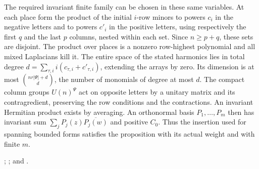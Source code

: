 The required invariant finite family can be chosen in these same
variables. At each place form the product of the initial $i$-row
minors to powers $c_i$ in the negative letters and to powers $c'_i$
in the positive letters, using respectively the first $q$ and the
last $p$ columns, nested within each set. Since $n\ge p+q$, these
sets are disjoint. The product over places is a nonzero row-highest
polynomial and all mixed Laplacians kill it. The entire space of
the stated harmonics lies in total degree
$d=\sum_{\tau,i}i(c_{\tau,i}+c'_{\tau,i})$, extending the arrays by
zero. Its dimension is at most $\binom{nr|\Psi|+d}{d}$, the number
of monomials of degree at most $d$. The compact column groups $U(n)^\Psi$ act on opposite letters
by a unitary matrix and its contragredient, preserving the row
conditions and the contractions. An invariant Hermitian product
exists by averaging. An orthonormal basis $P_1,\ldots,P_m$ then has
invariant sum $\sum_j P_j(z)\overline{P_j(w)}$ and positive $C_0$.
Thus the insertion used for spanning bounded forms satisfies the
proposition with its actual weight and with finite $m$.

;
; and
.
